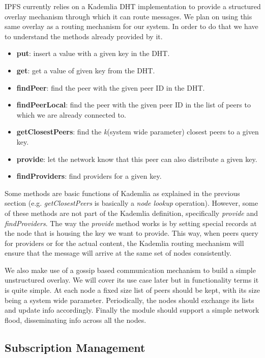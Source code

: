 IPFS currently relies on a Kademlia DHT implementation to provide a
structured overlay mechanism through which it can route messages. We
plan on using this same overlay as a routing mechanism for our system.
In order to do that we have to understand the methods already provided
by it.

\begin{itemize}
  \item
    \textbf{put}: insert a value with a given key in the DHT.
  \item
    \textbf{get}: get a value of given key from the DHT.
  \item
    \textbf{findPeer}: find the peer with the given peer ID in the DHT.
  \item
    \textbf{findPeerLocal}: find the peer with the given peer ID in the
    list of peers to which we are already connected to.
  \item
    \textbf{getClosestPeers}: find the \emph{k}(system wide parameter)
    closest peers to a given key.
  \item
    \textbf{provide}: let the network know that this peer can also
    distribute a given key.
  \item
    \textbf{findProviders}: find providers for a given key.
\end{itemize}

Some methods are basic functions of Kademlia as explained in the
previous section (e.g. \emph{getClosestPeers} is basically a \emph{node
lookup} operation). However, some of these methods are not part of the
Kademlia definition, specifically \emph{provide} and
\emph{findProviders}. The way the \emph{provide} method works is by
setting special records at the node that is housing the key we want to
provide. This way, when peers query for providers or for the actual
content, the Kademlia routing mechanism will ensure that the message
will arrive at the same set of nodes consistently.

We also make use of a gossip based communication mechanism to build a
simple unstructured overlay. We will cover its use case later but in
functionality terms it is quite simple. At each node a fixed size list
of peers should be kept, with its size being a system wide parameter.
Periodically, the nodes should exchange its lists and update info
accordingly. Finally the module should support a simple network flood,
disseminating info across all the nodes.

\subsection{Subscription Management}\label{subscription-management}

